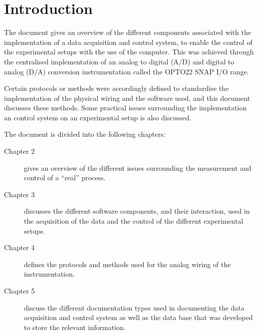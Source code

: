 \chapter{Introduction}
The document gives an overview of the different components associated with the implementation of a data acquisition and control system, to enable the control of the experimental setups with the use of the computer. This was achieved through the centralised implementation of an analog to digital (A/D) and digital to analog (D/A) conversion instrumentation called the OPTO22 SNAP I/O range.

Certain protocols or methods were accordingly defined to standardise the implementation of the physical wiring and the software used, and this document discusses these methods. Some practical issues surrounding the implementation an control system on an experimental setup is also discussed. 

The document is divided into the following chapters:
\begin{description}
	\item [Chapter 2] gives an overview of the different issues surrounding the measurement and control of a ``real'' process.
	\item [Chapter 3] discusses the different software components, and their interaction, used in the acquisition of the data and the control of the different experimental setups.
	\item [Chapter 4] defines the protocols and methods used for the analog wiring of the instrumentation.
	\item [Chapter 5] discuss the different documentation types used in documenting the data acquisition and control system as well as the data base that was developed to store the relevant information.
\end{description}
